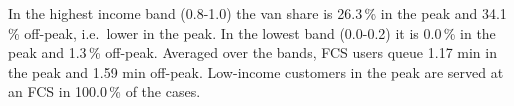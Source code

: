 In the highest income band (0.8-1.0) the van share is 26.3\,\% in the peak and 34.1\,\% off-peak, i.e.\ lower in the peak. In the lowest band (0.0-0.2) it is 0.0\,\% in the peak and 1.3\,\% off-peak. Averaged over the bands, FCS users queue 1.17 min in the peak and 1.59 min off-peak. Low-income customers in the peak are served at an FCS in 100.0\,\% of the cases.
